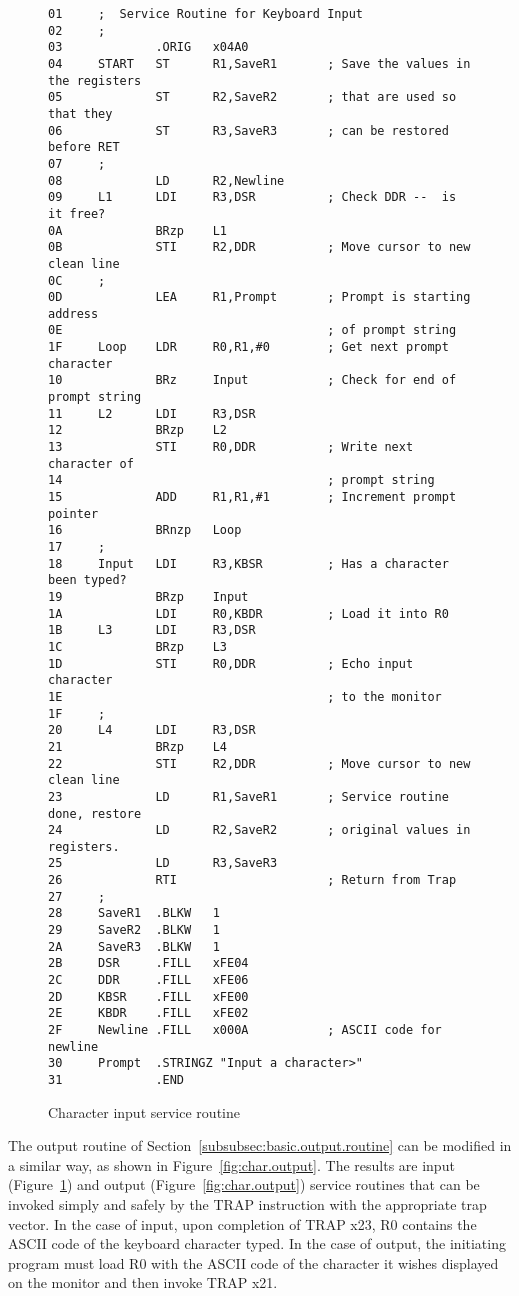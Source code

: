 \documentclass{patt}
\begin{document}
\begin{figure}[h!]
\begin{minipage}{36pc}
\begin{Verbatim}[fontsize=\fontsize{9}{10}\selectfont]
01     ;  Service Routine for Keyboard Input
02     ;
03             .ORIG   x04A0
04     START   ST      R1,SaveR1       ; Save the values in the registers
05             ST      R2,SaveR2       ; that are used so that they
06             ST      R3,SaveR3       ; can be restored before RET
07     ;
08             LD      R2,Newline
09     L1      LDI     R3,DSR          ; Check DDR --  is it free?
0A             BRzp    L1
0B             STI     R2,DDR          ; Move cursor to new clean line
0C     ;
0D             LEA     R1,Prompt       ; Prompt is starting address
0E                                     ; of prompt string
1F     Loop    LDR     R0,R1,#0        ; Get next prompt character
10             BRz     Input           ; Check for end of prompt string
11     L2      LDI     R3,DSR
12             BRzp    L2
13             STI     R0,DDR          ; Write next character of
14                                     ; prompt string
15             ADD     R1,R1,#1        ; Increment prompt pointer
16             BRnzp   Loop
17     ;
18     Input   LDI     R3,KBSR         ; Has a character been typed?
19             BRzp    Input
1A             LDI     R0,KBDR         ; Load it into R0
1B     L3      LDI     R3,DSR
1C             BRzp    L3
1D             STI     R0,DDR          ; Echo input character
1E                                     ; to the monitor
1F     ;
20     L4      LDI     R3,DSR
21             BRzp    L4
22             STI     R2,DDR          ; Move cursor to new clean line
23             LD      R1,SaveR1       ; Service routine done, restore
24             LD      R2,SaveR2       ; original values in registers.
25             LD      R3,SaveR3
26             RTI                     ; Return from Trap
27     ;
28     SaveR1  .BLKW   1
29     SaveR2  .BLKW   1
2A     SaveR3  .BLKW   1
2B     DSR     .FILL   xFE04
2C     DDR     .FILL   xFE06
2D     KBSR    .FILL   xFE00
2E     KBDR    .FILL   xFE02
2F     Newline .FILL   x000A           ; ASCII code for newline
30     Prompt  .STRINGZ "Input a character>"
31             .END
\end{Verbatim}
\caption{Character input service routine}
\label{fig:char.input}
\end{minipage}
\end{figure}

The output routine of Section~\ref{subsubsec:basic.output.routine} can
be modified in a similar way, as shown in
Figure~\ref{fig:char.output}.  The results are input
(Figure~\ref{fig:char.input}) and output
(Figure~\ref{fig:char.output}) service routines that can be invoked
simply and safely by the TRAP instruction with the appropriate trap
vector. In the case of input, upon completion of TRAP x23, R0 contains
the ASCII code of the keyboard character typed.  In the case of
output, the initiating program must load R0 with the ASCII code of the
character it wishes displayed on the monitor and then invoke TRAP x21.
\end{document}
